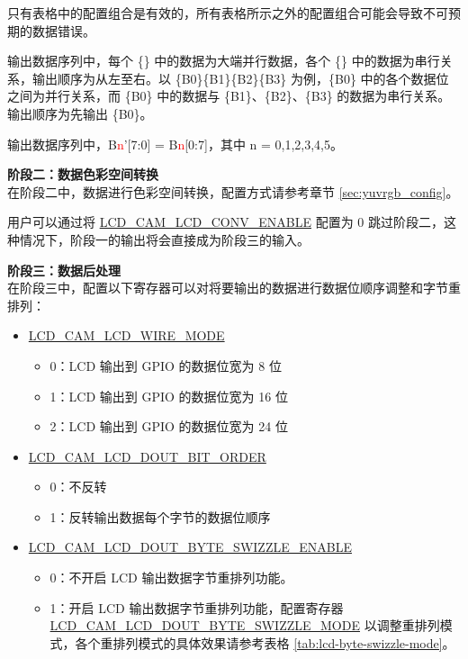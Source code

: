 \documentclass[main\_\_CN.tex]{subfiles}
\begin{document}
\begin{table}[H]
\begin{threeparttable}
\begin{tablenotes}
        \item[2] 只有表格中的配置组合是有效的，所有表格所示之外的配置组合可能会导致不可预期的数据错误。
        \item[3] 输出数据序列中，每个 \{\} 中的数据为大端并行数据，各个 \{\} 中的数据为串行关系，输出顺序为从左至右。以 \{B0\}\{B1\}\{B2\}\{B3\} 为例，\{B0\} 中的各个数据位之间为并行关系，而 \{B0\} 中的数据与 \{B1\}、\{B2\}、\{B3\} 的数据为串行关系。输出顺序为先输出 \{B0\}。
        \item[4] 输出数据序列中，B{\textcolor{red}{n}}'[7:0] = B{\textcolor{red}{n}}[0:7]，其中 n = 0,1,2,3,4,5。
    \end{tablenotes}
    \end{threeparttable}

\end{table}

\textbf{阶段二：数据色彩空间转换} \\
在阶段二中，数据进行色彩空间转换，配置方式请参考章节 \ref{sec:yuvrgb_config}。

\begin{tiplisting}
用户可以通过将 \hyperref[fielddesc:LCDCAMLCDCONVENABLE]{LCD\_CAM\_LCD\_CONV\_ENABLE} 配置为 0 跳过阶段二，这种情况下，阶段一的输出将会直接成为阶段三的输入。
\end{tiplisting}

\textbf{阶段三：数据后处理} \\
在阶段三中，配置以下寄存器可以对将要输出的数据进行数据位顺序调整和字节重排列：
\begin{itemize}
    \item \hyperref[fielddesc:LCDCAMLCDWIREMODE]{LCD\_CAM\_LCD\_WIRE\_MODE}
    \begin{itemize}
        \item 0：LCD 输出到 GPIO 的数据位宽为 8 位
        \item 1：LCD 输出到 GPIO 的数据位宽为 16 位
        \item 2：LCD 输出到 GPIO 的数据位宽为 24 位
    \end{itemize}
    \item \hyperref[fielddesc:LCDCAMLCDDOUTBITORDER]{LCD\_CAM\_LCD\_DOUT\_BIT\_ORDER}
    \begin{itemize}
        \item 0：不反转
        \item 1：反转输出数据每个字节的数据位顺序
    \end{itemize}
    \item \hyperref[fielddesc:LCDCAMLCDDOUTBYTESWIZZLEENABLE]{LCD\_CAM\_LCD\_DOUT\_BYTE\_SWIZZLE\_ENABLE}
    \begin{itemize}
        \item 0：不开启 LCD 输出数据字节重排列功能。
        \item 1：开启 LCD 输出数据字节重排列功能，配置寄存器 \hyperref[fielddesc:LCDCAMLCDDOUTBYTESWIZZLEMODE]{LCD\_CAM\_LCD\_DOUT\_BYTE\_SWIZZLE\_MODE} 以调整重排列模式，各个重排列模式的具体效果请参考表格 \ref{tab:lcd-byte-swizzle-mode}。
    \end{itemize}
\end{itemize}
\end{document}
